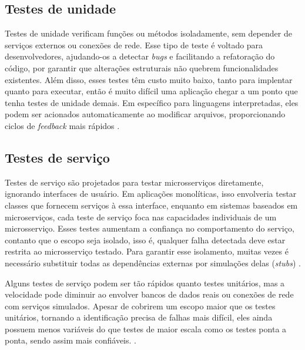 
\subsection{Testes de unidade}
Testes de unidade verificam funções ou métodos isoladamente, sem depender de serviços externos ou conexões de rede. Esse tipo de teste é voltado para desenvolvedores, ajudando-os a detectar \emph{bugs} e facilitando a refatoração do código, por garantir que alterações estruturais não quebrem funcionalidades existentes. Além disso, esses testes têm custo muito baixo, tanto para implentar quanto para executar, então é muito difícil uma aplicação chegar a um ponto que tenha testes de unidade demais. Em específico para linguagens interpretadas, eles podem ser acionados automaticamente ao modificar arquivos, proporcionando ciclos de \emph{feedback} mais rápidos \cite{livro-building-microservices}. 

\subsection{Testes de serviço}
Testes de serviço são projetados para testar microsserviços diretamente, ignorando interfaces de usuário. Em aplicações monolíticas, isso envolveria testar classes que fornecem serviços à essa interface, enquanto em sistemas baseados em microserviços, cada teste de serviço foca nas capacidades individuais de um microsserviço. Esses testes aumentam a confiança no comportamento do serviço, contanto que o escopo seja isolado, isso é, qualquer falha detectada deve estar restrita ao microsserviço testado. Para garantir esse isolamento, muitas vezes é necessário substituir todas as dependências externas por simulações delas (\emph{stubs}) \cite{livro-building-microservices}.

Alguns testes de serviço podem ser tão rápidos quanto testes unitários, mas a velocidade pode diminuir ao envolver bancos de dados reais ou conexões de rede com serviços simulados. Apesar de cobrirem um escopo maior que os testes unitários, tornando a identificação precisa de falhas mais difícil, eles ainda possuem menos variáveis do que testes de maior escala como os testes ponta a ponta, sendo assim mais confiáveis. \cite{livro-building-microservices}.

